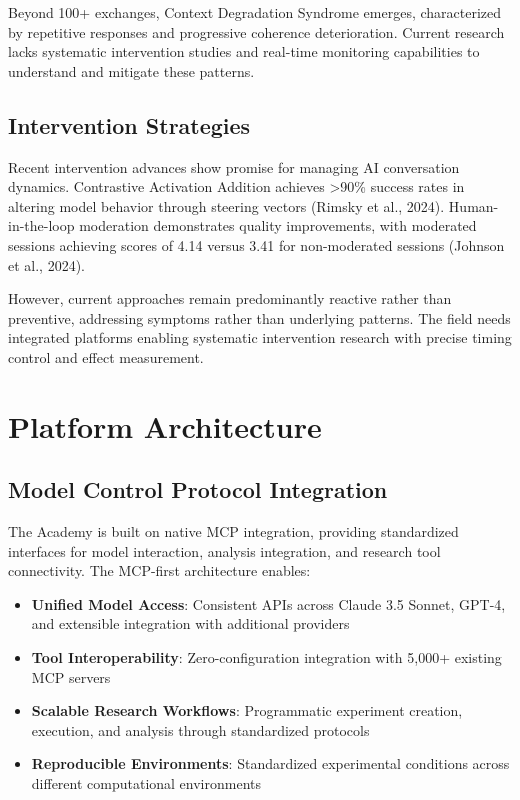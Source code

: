 \documentclass[11pt,letterpaper]{article}
\newcommand{\theacademy}{The Academy}
\newcommand{\mcp}{MCP}
\begin{document}
Beyond 100+ exchanges, Context Degradation Syndrome emerges, characterized by repetitive responses and progressive coherence deterioration. Current research lacks systematic intervention studies and real-time monitoring capabilities to understand and mitigate these patterns.

\subsection{Intervention Strategies}

Recent intervention advances show promise for managing AI conversation dynamics. Contrastive Activation Addition achieves >90\% success rates in altering model behavior through steering vectors (Rimsky et al., 2024). Human-in-the-loop moderation demonstrates quality improvements, with moderated sessions achieving scores of 4.14 versus 3.41 for non-moderated sessions (Johnson et al., 2024).

However, current approaches remain predominantly reactive rather than preventive, addressing symptoms rather than underlying patterns. The field needs integrated platforms enabling systematic intervention research with precise timing control and effect measurement.

\section{Platform Architecture}

\subsection{Model Control Protocol Integration}

\theacademy{} is built on native \mcp{} integration, providing standardized interfaces for model interaction, analysis integration, and research tool connectivity. The \mcp{}-first architecture enables:

\begin{itemize}
    \item \textbf{Unified Model Access}: Consistent APIs across Claude 3.5 Sonnet, GPT-4, and extensible integration with additional providers
    \item \textbf{Tool Interoperability}: Zero-configuration integration with 5,000+ existing \mcp{} servers
    \item \textbf{Scalable Research Workflows}: Programmatic experiment creation, execution, and analysis through standardized protocols
    \item \textbf{Reproducible Environments}: Standardized experimental conditions across different computational environments
\end{itemize}
\end{document}
